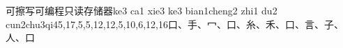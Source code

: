 \begin{EntryWithPhonetic*}{可擦写可编程只读存储器}{ke3 ca1 xie3 ke3 bian1cheng2 zhi1 du2 cun2chu3qi4}{5,17,5,5,12,12,5,10,6,12,16}{⼝、⼿、⼍、⼝、⽷、⽲、⼝、⾔、⼦、⼈、⼝}
\end{EntryWithPhonetic*}

